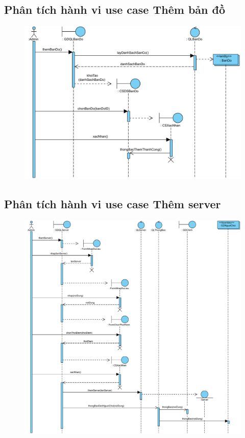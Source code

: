 \documentclass[3p]{elsarticle}
\begin{document}
\subsection{Phân tích hành vi use case Thêm bản đồ}
\begin{figure}[!htbp]
	\hspace*{-.5in}
	\centering
	\includegraphics[scale=.55]{images/sequence-pdfs/admin/addMap.pdf}
\end{figure}
\newpage

\subsection{Phân tích hành vi use case Thêm server}
\begin{figure}[!htbp]
	\hspace*{-.5in}
	\centering
	\includegraphics[scale=.55]{images/sequence-pdfs/admin/addServer.pdf}
\end{figure}
\newpage
\end{document}

